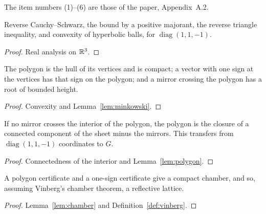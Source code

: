 The item numbers (1)--(6) are those of the paper, Appendix~A.2.

\begin{lemma}\label{lem:minkowski}
\leanok
Reverse Cauchy--Schwarz, the bound by a positive majorant, the reverse triangle inequality,
and convexity of hyperbolic balls, for $\operatorname{diag}(1,1,-1)$.
\end{lemma}
\begin{proof}\leanok
Real analysis on $\mathbb{R}^3$.
\end{proof}

\begin{lemma}[polygons, (2)]\label{lem:polygon}
\leanok
{}
The polygon is the hull of its vertices and is compact; a vector with one sign at the
vertices has that sign on the polygon; and a mirror crossing the polygon has a root of
bounded height.
\end{lemma}
\begin{proof}\leanok
Convexity and Lemma~\ref{lem:minkowski}.
\end{proof}

\begin{lemma}\label{lem:chamber}
\leanok
{}
If no mirror crosses the interior of the polygon, the polygon is the closure of a connected
component of the sheet minus the mirrors. This transfers from $\operatorname{diag}(1,1,-1)$
coordinates to $G$.
\end{lemma}
\begin{proof}\leanok
Connectedness of the interior and Lemma~\ref{lem:polygon}.
\end{proof}

\begin{theorem}\label{thm:bridge}
\leanok
{}
A polygon certificate and a one-sign certificate give a compact chamber, and so, assuming
Vinberg's chamber theorem, a reflective lattice.
\end{theorem}
\begin{proof}\leanok
Lemma~\ref{lem:chamber} and Definition~\ref{def:vinberg}.
\end{proof}

